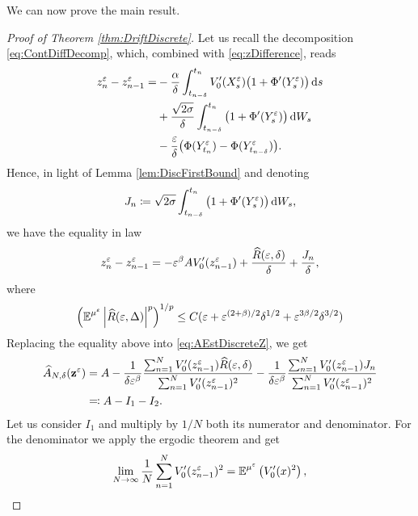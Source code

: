 \documentclass[10pt]{article}
\begin{document}
We can now prove the main result.
\begin{proof}[Proof of Theorem \ref{thm:DriftDiscrete}]  Let us recall the decomposition \eqref{eq:ContDiffDecomp}, which, combined with \eqref{eq:zDifference}, reads
	\begin{equation}
	\begin{aligned}
		z^\varepsilon_n - z^\varepsilon_{n-1} = &- \frac{\alpha}{\delta}\int_{t_{n-\delta}}^{t_n} V_0'(X^\varepsilon_s)\big(1 + \Phi'(Y^\varepsilon_s)\big)\,\mathrm{d} s \\
		&+\frac{\sqrt{2\sigma}}{\delta}\int_{t_{n-\delta}}^{t_n} \big(1 + \Phi'(Y^\varepsilon_s)\big) \,\mathrm{d} W_s \\
		&-\frac{\varepsilon}{\delta} \big(\Phi(Y^\varepsilon_{t_n})- \Phi(Y^\varepsilon_{t_{n-\delta}})\big).
	\end{aligned}
	\end{equation}
	Hence, in light of Lemma \ref{lem:DiscFirstBound} and denoting 
	\begin{equation}
		J_n \coloneqq \sqrt{2\sigma}\int_{t_{n-\delta}}^{t_n} \big(1 + \Phi'(Y^\varepsilon_s)\big) \,\mathrm{d} W_s,
	\end{equation}
	we have the equality in law
	\begin{equation}
		z^\varepsilon_n - z^\varepsilon_{n-1} = -\varepsilon^\beta A V_0'(z^\varepsilon_{n-1}) + \frac{\widehat R(\varepsilon, \delta)}{\delta} + \frac{J_n}{\delta},
	\end{equation}
	where
	\begin{equation}
		\left(\operatorname{\mathbb{E}}^{\mu^\varepsilon} \left\lvert\widehat R(\varepsilon, \Delta)\right\rvert^p\right)^{1/p} \leq C(\varepsilon +  \varepsilon^{(2+\beta)/2}\delta^{1/2} + \varepsilon^{3\beta/2}\delta^{3/2})
	\end{equation}
	Replacing the equality above into \eqref{eq:AEstDiscreteZ}, we get
	\begin{equation}
	\begin{aligned}
		\widehat A_{N, \delta}(\mathbf z^\varepsilon) &= A -\frac{1}{\delta \varepsilon^\beta}\frac{\sum_{n=1}^{N}V_0'(z^\varepsilon_{n-1})\widehat R(\varepsilon, \delta)}{\sum_{n=1}^{N} V_0'(z^\varepsilon_{n-1})^2} - \frac{1}{\delta \varepsilon^\beta}\frac{\sum_{n=1}^{N}V_0'(z^\varepsilon_{n-1})J_n}{\sum_{n=1}^{N} V_0'(z^\varepsilon_{n-1})^2} \\
		&\eqqcolon A - I_1 - I_2.
	\end{aligned}
	\end{equation}
	Let us consider $I_1$ and multiply by $1/N$ both its numerator and denominator. For the denominator we apply the ergodic theorem and get
	\begin{equation}
		\lim_{N \to \infty} \frac1N \sum_{n=1}^{N} V_0'(z^\epl_{n-1})^2 = \E^{\mu^\epl} \left(V_0'(x)^2\right),

\end{equation}
\end{proof}
\end{document}
